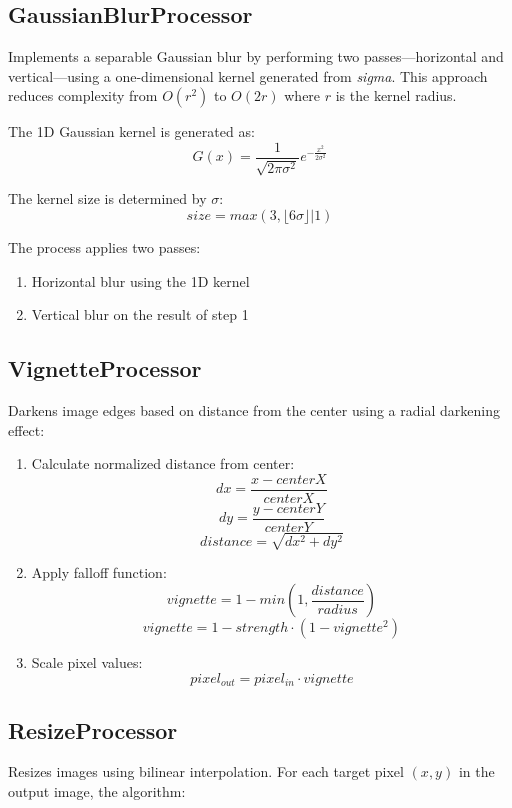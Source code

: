 \documentclass[12pt,a4paper]{report}
\begin{document}
\subsection{GaussianBlurProcessor}
Implements a separable Gaussian blur by performing two passes—horizontal and vertical—using a one-dimensional kernel generated from \textit{sigma}. This approach reduces complexity from $O(r^2)$ to $O(2r)$ where $r$ is the kernel radius.

The 1D Gaussian kernel is generated as:
\[ G(x) = \frac{1}{\sqrt{2\pi\sigma^2}} e^{-\frac{x^2}{2\sigma^2}} \]

The kernel size is determined by $\sigma$:
\[ size = max(3, \lfloor 6\sigma \rfloor | 1) \]

The process applies two passes:
\begin{enumerate}
    \item Horizontal blur using the 1D kernel
    \item Vertical blur on the result of step 1
\end{enumerate}

\subsection{VignetteProcessor}
Darkens image edges based on distance from the center using a radial darkening effect:
\begin{enumerate}
    \item Calculate normalized distance from center:
    \[ dx = \frac{x - centerX}{centerX} \]
    \[ dy = \frac{y - centerY}{centerY} \]
    \[ distance = \sqrt{dx^2 + dy^2} \]
    
    \item Apply falloff function:
    \[ vignette = 1 - min(1, \frac{distance}{radius}) \]
    \[ vignette = 1 - strength \cdot (1 - vignette^2) \]
    
    \item Scale pixel values:
    \[ pixel_{out} = pixel_{in} \cdot vignette \]
\end{enumerate}

\subsection{ResizeProcessor}
Resizes images using bilinear interpolation. For each target pixel $(x, y)$ in the output image, the algorithm:
\end{document}
